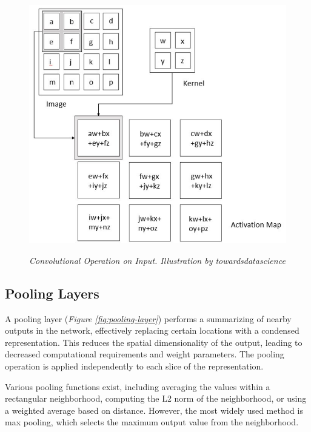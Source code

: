 \begin{figure}[H] \centering
  \begin{adjustbox}{width=0.75\textwidth, trim={0cm 0cm 0cm 0.35cm}, clip}
  \includegraphics[]{imatges/preliminaries/convolutional-layer.png}
  \end{adjustbox}
  \caption[Convolutional Operation on Input]{\textit{Convolutional
  Operation on Input. Illustration by towardsdatascience}}
{\label{fig:convolutional-layer}} \end{figure}

\newpage

\subsection{Pooling Layers}

A pooling layer (\textit{Figure \ref{fig:pooling-layer}}) performs a
summarizing of nearby outputs in the network, effectively replacing certain
locations with a condensed representation. This reduces the spatial
dimensionality of the output, leading to decreased computational requirements
and weight parameters. The pooling operation is applied independently to each
slice of the representation. \newline

Various pooling functions exist, including averaging the values within a
rectangular neighborhood, computing the L2 norm of the neighborhood, or using a
weighted average based on distance. However, the most widely used method is max
pooling, which selects the maximum output value from the neighborhood.

